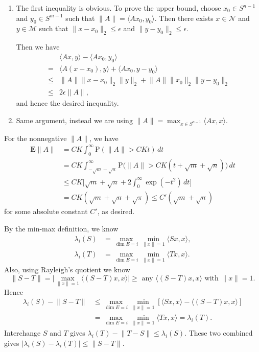 \documentclass[11pt]{article}
\newcommand{\inp}[2]{\langle #1, #2 \rangle}
\newcommand{\nm}[1]{\lVert #1 \rVert}
\newcommand{\abs}[1]{\lvert #1 \rvert}
\renewcommand{\Pr}{\mathrm{P}}
\newcommand{\E}{\mathbf{E}}
\theoremstyle{plain}
\theoremstyle{definition}
\theoremstyle{remark}
\theoremstyle{definition}
\newenvironment{mansol}[1]{%
  \renewcommand\themansolinner{#1}%
  \mansolinner
}{\endmansolinner}
\begin{document}
\begin{mansol}{4.4.3}
    \begin{enumerate}[label=(\alph*)]
        \item The first inequality is obvious. To prove the upper bound, choose $x_0 \in S^{n-1}$ and $y_0 \in S^{m-1}$ such that $\nm{A} = \inp{Ax_0}{y_0}$. Then there exists $x\in\mathcal{N}$ and $y \in \mathcal{M}$ such that $\nm{x - x_0}_2 \leq \epsilon$ and $\nm{y - y_0}_2 \leq \epsilon$.

        Then we have \begin{align*}
            & \inp{Ax}{y} - \inp{Ax_0}{y_0} \\
            ={} & \inp{A(x-x_0)}{y} + \inp{Ax_0}{y-y_0} \\
            \leq{} & \nm{A}\nm{x-x_0}_2\nm{y}_2 + \nm{A}\nm{x_0}_2\nm{y-y_0}_2 \\
            \leq{} & 2 \epsilon \nm{A},
        \end{align*}
        and hence the desired inequality.
        \item Same argument, instead we are using $\nm{A} = \max_{x \in S^{n-1}} \inp{Ax}{x}$.
    \end{enumerate}
\end{mansol}

\begin{mansol}{4.4.6}
    For the nonnegative $\nm{A}$, we have \begin{align*}
        \E \nm{A} & = CK \int_0^\infty \Pr(\nm{A} > CKt)\,dt \\
        & = CK \int_{-\sqrt{m}-\sqrt{n}}^\infty \Pr\bigl(\nm{A} > CK(t+ \sqrt{m} + \sqrt{n})\bigr)\,dt \\
        & \leq CK\Big[\sqrt{m} + \sqrt{n} + 2 \int_0^\infty \exp(-t^2)\,dt\Bigr] \\
        & = CK(\sqrt{m}+\sqrt{n} + \sqrt{\pi}) \leq C'(\sqrt{m} + \sqrt{n})
    \end{align*}
    for some absolute constant $C'$, as desired.
\end{mansol}

\begin{mansol}{4.5.3}[Weyl's inequality]
By the min-max definition, we know \begin{align*}
\lambda_i(S) & = \max_{\dim E = i} \min_{\nm{x} = 1} \inp{Sx}{x},\\
\lambda_i(T) & = \max_{\dim E = i} \min_{\nm{x} = 1} \inp{Tx}{x}.
\end{align*}
Also, using Rayleigh's quotient we know \[
\textstyle\nm{S-T} = \big\lvert\max_{\nm{x} = 1}\inp{(S-T)x}{x}\big\rvert \geq \text{ any } \inp{(S-T)x}{x} \text{ with }\nm{x} = 1.
\]
Hence \begin{align*}
\lambda_i(S) - \nm{S-T} & \leq \max_{\dim E = i} \min_{\nm{x} = 1} [\inp{Sx}{x} - \inp{(S-T)x}{x}] \\
& = \max_{\dim E = i} \min_{\nm{x} = 1} \inp{Tx}{x} = \lambda_i(T).
\end{align*}
Interchange $S$ and $T$ gives $\lambda_i(T) - \nm{T - S} \leq \lambda_i(S)$. These two combined gives $\abs{\lambda_i(S) - \lambda_i(T)} \leq \nm{S-T}$.
\end{mansol}
\end{document}
